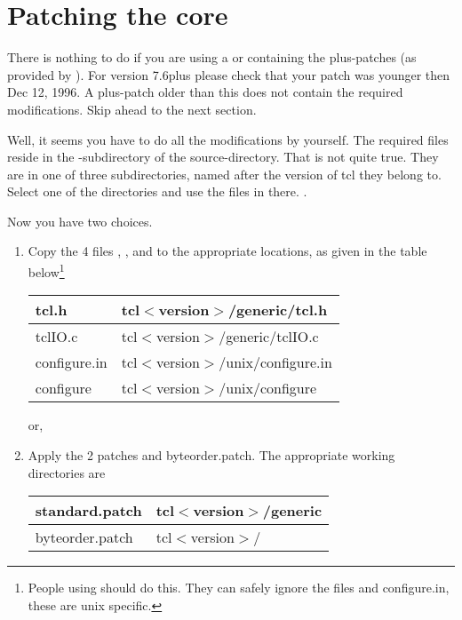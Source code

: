 \documentclass {report}
\begin{document}
\chapter  {Patching the core}\label {scalpel}

There is nothing to do if you are using a \tclsh{} or \wish{}
containing the plus-patches (as provided by \jan). For version 7.6plus
please check that your patch was younger then Dec 12, 1996. A
plus-patch older than this does not contain the required
modifications. Skip ahead to the next section.


Well, it seems you have to do all the modifications by yourself. The
required files reside in the -subdirectory of the
source-directory. That is not quite true. They are in one of three
subdirectories, named after the version of tcl they belong to. Select
one of the directories and use the files in there. .

Now you have two choices.

\begin {enumerate}
\item	Copy the 4 files , , 
	and  to the appropriate locations, as given
	in the table below\footnote {People using \win{} should do
	this. They can safely ignore the files  and \file
	{configure.in}, these are unix specific.} 

	\begin {tabular} {|l|l|} \hline
	tcl.h		& tcl$<$version$>$/generic/tcl.h	\\ \hline
	tclIO.c		& tcl$<$version$>$/generic/tclIO.c	\\ \hline
	configure.in	& tcl$<$version$>$/unix/configure.in	\\ \hline
	configure	& tcl$<$version$>$/unix/configure	\\ \hline
	\end {tabular}

	or,

\item	Apply the 2 patches  and \file
	{byteorder.patch}. The appropriate working directories are

	\begin {tabular} {|l|l|} \hline
	standard.patch	& tcl$<$version$>$/generic	\\ \hline
	byteorder.patch	& tcl$<$version$>$/		\\ \hline
	\end {tabular}
\end   {enumerate}
\end{document}
